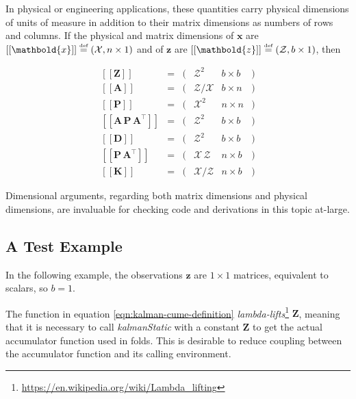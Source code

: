 \documentclass[10pt,oneside,x11names]{article}
\begin{document}
In physical or engineering applications, these quantities carry physical
dimensions of units of measure in addition to their matrix dimensions as numbers
of rows and columns. 
If the physical and matrix dimensions of 
\(\mathbold{x}\) 
are
\(\left[\left[\mathbold{x}\right]\right]
\stackrel{\text{\tiny def}}{=}
(\mathcal{X}, n\times{1})\)
and of 
\(\mathbold{z}\) 
are
\(\left[\left[\mathbold{z}\right]\right]
\stackrel{\text{\tiny def}}{=}
(\mathcal{Z}, b\times{1})\), then

\begin{equation}
\label{eqn:dimensional-breakdown}
\begin{array}{lccccr}
\left[\left[\mathbold{Z}\right]\right]                                       &=& (&\mathcal{Z}^2            & b\times{b}&) \\
\left[\left[\mathbold{A}\right]\right]                                       &=& (&\mathcal{Z}/\mathcal{X}  & b\times{n}&) \\
\left[\left[\mathbold{P}\right]\right]                                       &=& (&\mathcal{X}^2            & n\times{n}&) \\
\left[\left[\mathbold{A}\,\mathbold{P}\,\mathbold{A}^\intercal\right]\right] &=& (&\mathcal{Z}^2            & b\times{b}&) \\
\left[\left[\mathbold{D}\right]\right]                                       &=& (&\mathcal{Z}^2            & b\times{b}&) \\
\left[\left[\mathbold{P}\,\mathbold{A}^\intercal\right]\right]               &=& (&\mathcal{X}\,\mathcal{Z} & n\times{b}&) \\
\left[\left[\mathbold{K}\right]\right]                                       &=& (&\mathcal{X}/\mathcal{Z}  & n\times{b}&)
\end{array}
\end{equation}

Dimensional arguments, regarding both matrix dimensions and physical dimensions,
are invaluable for checking code and derivations in this topic at-large.

\subsection{A Test Example}
\label{sec:orgheadline2}

In the following  example, the observations \(\mathbold{z}\) are
\(1\times{1}\) matrices, equivalent to scalars, so \(b=1\).

The function in equation \ref{eqn:kalman-cume-definition}
\emph{lambda-lifts}\footnote{\url{https://en.wikipedia.org/wiki/Lambda_lifting}} \(\mathbold{Z}\), meaning that it is necessary to call
\emph{kalmanStatic} with a constant \(\mathbold{Z}\) to get the actual accumulator
function used in folds. This is desirable to reduce coupling between the
accumulator function and its calling environment. 
\end{document}

